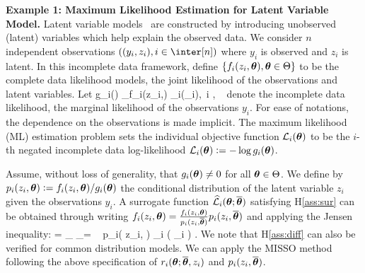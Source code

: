 \documentclass{article}
\begin{document}
\textbf{Example 1: Maximum Likelihood Estimation for Latent Variable Model.}
Latent variable models~\cite{bishop2006pattern} are constructed by introducing unobserved (latent) variables which help explain the observed data.
We consider $n$ independent observations $((y_i, z_i), i \in \inter[n])$ where $y_i$ is observed and $z_i$ is latent.
In this incomplete data framework, define $ \{f_i(z_i, \param), \param \in \Param \}$ to be the complete data likelihood models, \ie the joint likelihood of the observations and latent variables. Let 
\beq \notag
g_i(\param) \eqdef \int_{\Zset}{f_i(z_i,\param) \mu_i(\dz_i)},~i \in \inter, ~\param \in\Param
\eeq 
denote the incomplete data likelihood, \ie the marginal likelihood of the observations $y_i$.
For ease of notations, the dependence on the observations is made implicit.
The maximum likelihood (ML) estimation problem sets the individual objective function ${\cal L}_i(\param)$ to be the $i$-th negated incomplete data log-likelihood ${\cal L}_i(\param) \eqdef - \log g_i(\param)$. 

Assume, without loss of generality, that $g_i(\param) \neq 0$ for all $\param \in \Param$.
We define by $p_i(z_i, \param) \eqdef f_i(z_i,\param)/g_i(\param)$ the conditional distribution of the latent variable $z_i$ given the observations $y_i$.
A surrogate function $\sur{i}{\param}{\op}$ satisfying H\ref{ass:sur} can be obtained through writing
$f_i(z_i,\param) = \frac{f_i(z_i,\param)}{p_i(z_i, \op)} p_i(z_i,\op)$ and applying the Jensen inequality:
\beq\label{pairmcem}
 = \int_{\Zset} _{=  } \!~ p_i( z_i, \op ) \mu_i ( \dz_i ) \eqsp.
\eeq
We note that H\ref{ass:diff} can also be verified for common distribution models.
We can apply the MISSO method following the above specification of $\rsur{i}{\param}{\op}{z_i}$ and $p_i( z_i, \op )$.
\end{document}
